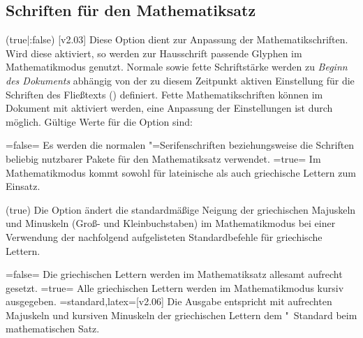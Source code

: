 \begin{DeclareEntity*}{}
\begin{DeclareEntity*}{}
\begin{DeclareEntity*}{}
\subsection{%
  Schriften für den Mathematiksatz%
  \label{sec:math}%
}
%
\begin{Declaration}
  {}
  (true|:false)
  [v2.03]
\printdeclarationlist
%
Diese Option dient zur Anpassung der Mathematikschriften. Wird diese aktiviert, 
so werden zur Hausschrift passende Glyphen im Mathematikmodus genutzt. Normale 
sowie fette Schriftstärke werden zu \emph{Beginn des Dokuments} abhängig von 
der zu diesem Zeitpunkt aktiven Einstellung für die Schriften des Fließtexts 
() definiert. Fette Mathematikschriften 
können im Dokument mit  aktiviert werden, eine Anpassung der 
Einstellungen ist durch  möglich. Gültige Werte für die 
Option  sind:
\begin{DeclareValues}
\itemval=false=
  Es werden die normalen "=Serifenschriften beziehungsweise die 
  Schriften beliebig nutzbarer Pakete für den Mathematiksatz verwendet.
\itemval*=true=
  Im Mathematikmodus kommt \OpenSans sowohl für lateinische als auch 
  griechische Lettern zum Einsatz.
\end{DeclareValues}
\end{Declaration}

\begin{Declaration}
  {}
  (true)
Die Option ändert die standardmäßige Neigung der griechischen Majuskeln und 
Minuskeln (Groß- und Kleinbuchstaben) im Mathematikmodus bei einer Verwendung 
der nachfolgend aufgelisteten Standardbefehle für griechische Lettern.
\begin{DeclareValues}
\itemval=false=
  Die griechischen Lettern werden im Mathematiksatz allesamt aufrecht gesetzt.
\itemval*=true=
  Alle griechischen Lettern werden im Mathematikmodus kursiv ausgegeben.
\itemval=standard,latex=[v2.06]
  Die Ausgabe entspricht mit aufrechten Majuskeln und kursiven Minuskeln der 
  griechischen Lettern dem "~Standard beim mathematischen Satz.
\end{DeclareValues}
\end{Declaration}


\end{DeclareEntity*}
\end{DeclareEntity*}
\end{DeclareEntity*}
